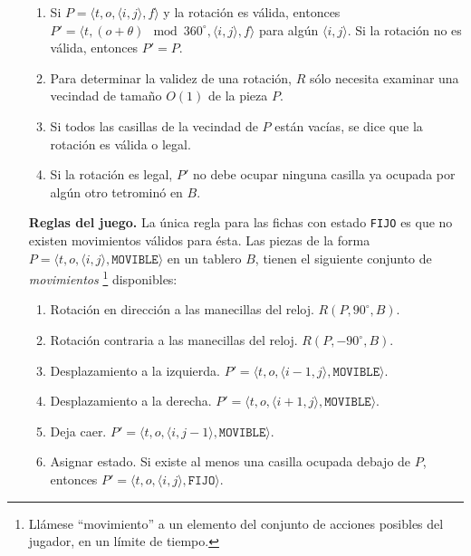 \begin{itemize}[leftmargin=0.8cm,align=left]
\begin{enumerate}
\item Si $P = \langle t, o, \langle i,j \rangle, f\rangle$ y la rotación es válida,
entonces $P' = \langle t, (o + \theta) \mod 360^{\circ}, \langle i,j \rangle, f\rangle$
para algún $\langle i,j \rangle$. Si la rotación no es válida, entonces $P' = P$.

\item Para determinar la validez de una rotación, $R$ sólo necesita examinar
una vecindad de tamaño $O(1)$ de la pieza $P$.

\item Si todos las casillas de la vecindad de $P$ están vacías, se dice que la
rotación es válida o legal.

\item Si la rotación es legal, $P'$ no debe ocupar ninguna casilla ya ocupada
por algún otro tetrominó en $B$.

\end{enumerate}

\item[\textbf{Reglas del juego. }] La única regla para las fichas con estado
\texttt{FIJO} es que no existen movimientos válidos para ésta. Las piezas de
la forma $P = \langle t, o, \langle i,j \rangle, \texttt{MOVIBLE}\rangle$ en un
tablero $B$, tienen el siguiente conjunto de \textit{movimientos}
\footnote{Llámese ``movimiento'' a un elemento del conjunto de acciones posibles 
del jugador, en un límite de tiempo.} disponibles:

\begin{enumerate}
\item Rotación en dirección a las manecillas del reloj. $R(P, 90^{\circ}, B)$.

\item Rotación contraria a las manecillas del reloj. $R(P, -90^{\circ}, B)$.

\item Desplazamiento a la izquierda.
$P' = \langle t, o, \langle i - 1,j \rangle, \texttt{MOVIBLE}\rangle$.

\item Desplazamiento a la derecha.
$P' = \langle t, o, \langle i + 1,j \rangle, \texttt{MOVIBLE}\rangle$.

\item Deja caer. $P' = \langle t, o, \langle i,j - 1 \rangle, \texttt{MOVIBLE}\rangle$.

\item Asignar estado. Si existe al menos una casilla ocupada debajo de $P$,
entonces $P' = \langle t, o, \langle i,j \rangle, \texttt{FIJO}\rangle$.
\end{enumerate}


\end{itemize}
